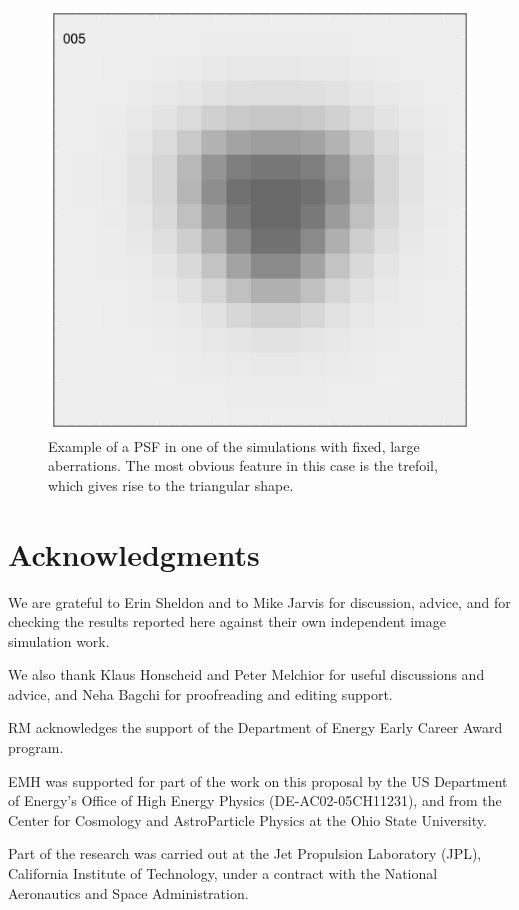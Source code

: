 \documentclass[iop]{emulateapj}
\begin{document}
\begin{figure}
\begin{center}
\includegraphics[width=0.8\columnwidth]{rgc_fixedaber_psf_005.pdf}
\end{center}
\caption{Example of a PSF in one of the simulations with fixed, large aberrations.  The most obvious
feature in this case is the trefoil, which gives rise to the triangular shape. \label{fig:trefoil}}
\end{figure}



\section*{Acknowledgments}

We are grateful to Erin Sheldon and to Mike Jarvis for
discussion, advice, and for checking the results reported here against
their own independent image simulation work.

We also thank Klaus Honscheid and Peter Melchior for useful
discussions and advice, and Neha Bagchi for proofreading and editing
support.

RM acknowledges the support of the Department of Energy Early Career
Award program.

EMH was supported for part of the work on this proposal by the US
Department of Energy’s Office of High Energy Physics
(DE-AC02-05CH11231), and from the Center for Cosmology and
AstroParticle Physics at the Ohio State University.

Part of the research was carried out at the Jet Propulsion Laboratory
(JPL), California Institute of Technology, under a contract with the
National Aeronautics and Space Administration.



\end{document}
